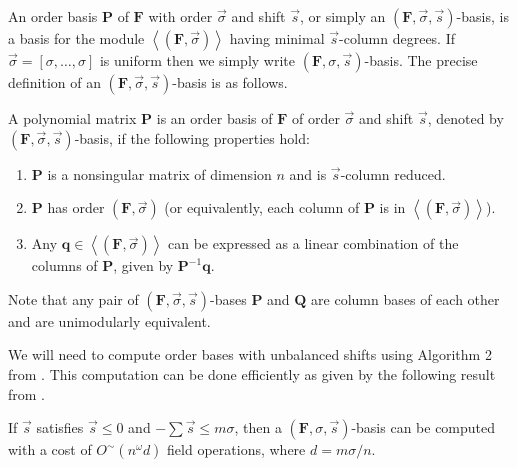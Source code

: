An order basis \cite{BeLa94,BL1997} $\mathbf{P}$ of $\mathbf{F}$
with order $\vec{\sigma}$ and shift $\vec{s}$, or simply an $\left(\mathbf{F},\vec{\sigma},\vec{s}\right)$-basis,
is a basis for the module $\left\langle \left(\mathbf{F},\vec{\sigma}\right)\right\rangle $
having minimal $\vec{s}$-column degrees. If $\vec{\sigma}=\left[\sigma,\dots,\sigma\right]$
is uniform then we simply write $\left(\mathbf{F},\sigma,\vec{s}\right)$-basis.
The precise definition of an $\left(\mathbf{F},\vec{\sigma},\vec{s}\right)$-basis
is as follows. 
\begin{defn}
\label{def:orderBasis}A polynomial matrix $\mathbf{P}$ is an order
basis of $\mathbf{F}$ of order $\vec{\sigma}$ and shift $\vec{s}$,
denoted by $\left(\mathbf{F},\vec{\sigma},\vec{s}\right)$-basis,
if the following properties hold: 
\begin{enumerate}
\item $\mathbf{P}$ is a nonsingular matrix of dimension $n$ and is $\vec{s}$-column
reduced. 
\item $\mathbf{P}$ has order $\left(\mathbf{F},\vec{\sigma}\right)$ (or
equivalently, each column of $\mathbf{P}$ is in $\left\langle (\mathbf{F},\vec{\sigma})\right\rangle $). 
\item Any $\mathbf{q}\in\left\langle \left(\mathbf{F},\vec{\sigma}\right)\right\rangle $
can be expressed as a linear combination of the columns of $\mathbf{P}$,
given by $\mathbf{P}^{-1}\mathbf{q}$. 
\end{enumerate}
\end{defn}


Note that any pair of $\left(\mathbf{F},\vec{\sigma},\vec{s}\right)$-bases
$\mathbf{P}$ and $\mathbf{Q}$ are column bases of each other and
are unimodularly equivalent.

We will need to compute order bases with unbalanced shifts using Algorithm
2 from \cite{za2009}. This computation can be done efficiently as
given by the following result from \cite{za2009}.
\begin{thm}
\label{thm:unbalancedOrderBasisCost}If %
$\vec{s}$ satisfies
$\vec{s}\le0$ and $-\sum\vec{s}\le m\sigma$, then a $\left(\mathbf{F},\sigma,\vec{s}\right)$-basis
can be computed with a cost of $O^{\sim}(n^{\omega}d)$ field operations,
where $d=m\sigma/n$. 
\end{thm}

